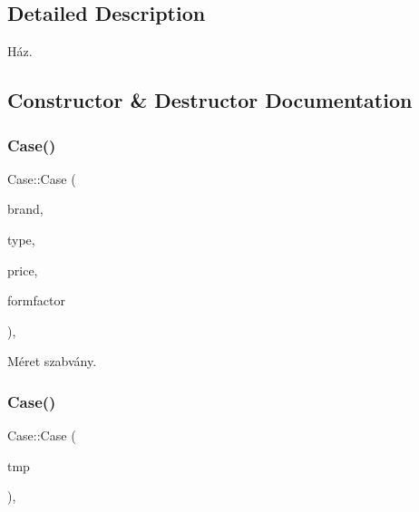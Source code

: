\subsection{Detailed Description}
Ház. 

\subsection{Constructor \& Destructor Documentation}
\mbox{\label{class_case_a0d953adffc664636549235d729f13260}} 
\subsubsection{\texorpdfstring{Case()}{Case()}\hspace{0.1cm}{\footnotesize\ttfamily [1/2]}}
{\footnotesize\ttfamily Case\+::\+Case (\begin{DoxyParamCaption}\item[{\mbox{\hyperlink{class_string}{String}}}]{brand,  }\item[{\mbox{\hyperlink{class_string}{String}}}]{type,  }\item[{int}]{price,  }\item[{\mbox{\hyperlink{class_string}{String}}}]{formfactor }\end{DoxyParamCaption})\hspace{0.3cm}{\ttfamily [inline]}, {\ttfamily [explicit]}}



Méret szabvány. 

\mbox{\label{class_case_a300362691710d1f9312f9d31d56ea53e}} 
\subsubsection{\texorpdfstring{Case()}{Case()}\hspace{0.1cm}{\footnotesize\ttfamily [2/2]}}
{\footnotesize\ttfamily Case\+::\+Case (\begin{DoxyParamCaption}\item[{\mbox{\hyperlink{struct_temp_input}{Temp\+Input}}}]{tmp }\end{DoxyParamCaption})\hspace{0.3cm}{\ttfamily [inline]}, {\ttfamily [explicit]}}



